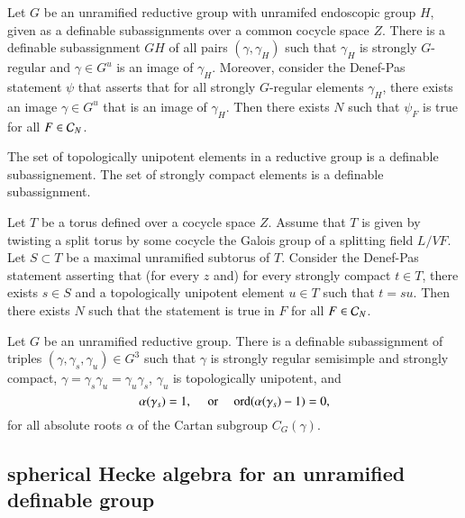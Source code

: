 \begin{lemma} 
  Let $G$ be an unramified reductive group with unramifed endoscopic
  group $H$, given as a definable subassignments over a common cocycle
  space $Z$.  There is a definable subassignment $GH$ of all pairs
  $(\gamma,\gamma_H)$ such that $\gamma_H$ is strongly $G$-regular and
  $\gamma\in G^u$ is an image of $\gamma_H$.  Moreover, consider the
  Denef-Pas statement $\psi$ that asserts that for all strongly
  $G$-regular elements $\gamma_H$, there exists an image $\gamma\in
  G^u$ that is an image of $\gamma_H$.  Then there exists $N$ such
  that $\psi_F$ is true for all $F\in\mathcal C_N$.
\end{lemma}

\begin{lemma} 
  The set of topologically unipotent elements in a reductive group is
  a definable subassignement.  The set of strongly compact elements is
  a definable subassignment.
\end{lemma}

\begin{lemma} 
  Let $T$ be a torus defined over a cocycle space $Z$. Assume that $T$
  is given by twisting a split torus by some cocycle the Galois group
  of a splitting field $L/VF$.  Let $S\subset T$ be a maximal
  unramified subtorus of $T$.  Consider the Denef-Pas statement
  asserting that (for every $z$ and) for every strongly compact $t\in
  T$, there exists $s\in S$ and a topologically unipotent element
  $u\in T$ such that $t =s u$.  Then there exists $N$ such that the
  statement is true in $F$ for all $F\in \mathcal C_N$.
\end{lemma}

\begin{lemma} 
  Let $G$ be an unramified reductive group.  There is a definable
  subassignment of triples $(\gamma,\gamma_s,\gamma_u)\in G^3$ such
  that $\gamma$ is strongly regular semisimple and strongly compact,
  $\gamma = \gamma_s \gamma_u = \gamma_u\gamma_s$, $\gamma_u$ is
  topologically unipotent, and
\[
\alpha(\gamma_s)=1,
\quad\text{ or }
\quad {\operatorname{ord}}(\alpha(\gamma_s)-1)=0,
\]
for all absolute roots $\alpha$ of the Cartan subgroup $C_G(\gamma)$.
\end{lemma}

\subsection{spherical Hecke algebra for an unramified definable group}

